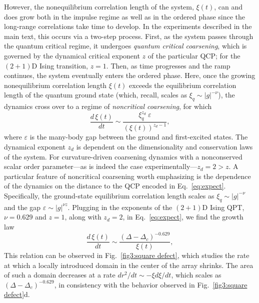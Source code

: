 \documentclass[reprint,twocolumn,secnumarabic,amssymb, aps, prx]{revtex4-2}
\begin{document}
However, the nonequilibrium correlation length of the system, $\xi (t)$, can and does grow both in the impulse regime as well as in the ordered phase since the long-range correlations take time to develop. In the experiments described in the main text, this occurs via a two-step process.
First, as the system passes through the quantum critical regime, it undergoes \textit{quantum critical coarsening}, which is governed by the dynamical critical exponent $z$ of the particular QCP; for the $(2+1)$D Ising transition, $z=1$. Then, as time progresses and the ramp continues, the system eventually enters the ordered phase. Here, once the growing nonequilibrium correlation length $\xi(t)$ exceeds the equilibrium correlation length of the quantum ground state (which, recall, scales as $\xi_q \sim \lvert g \rvert^{-\nu}$), the dynamics cross over to a regime of \textit{noncritical coarsening}, for which
\begin{equation}
\label{eq:expect}
 \frac{d\,\xi(t)}{dt} \sim \frac{\xi_q^{z_d}~\varepsilon}{(\xi(t))^{z_d-1}},
\end{equation}
where $\varepsilon$ is the many-body gap between the ground and first-excited states.  The dynamical exponent $z_d$ is dependent on the dimensionality and conservation laws of the system. For curvature-driven coarsening dynamics with a nonconserved scalar order parameter---as is indeed the case experimentally---$z_d = 2 > z$. A particular feature of noncritical coarsening worth emphasizing is the dependence of the dynamics on the distance to the QCP encoded in  Eq.~\eqref{eq:expect}. Specifically, the ground-state equilibrium correlation length scales as $\xi_q \sim \lvert g \rvert^{-\nu}$ and the gap $\varepsilon \sim \lvert g \rvert^{\nu z}$. Plugging in the exponents of the $(2+1)$D Ising QPT, $\nu = 0.629$ and $z=1$, along with $z_d = 2$, in Eq.~\eqref{eq:expect}, we find the growth law
\begin{equation}
 \frac{d\,\xi(t)}{dt} \sim \frac{(\Delta - \Delta_c)^{-0.629}}{\xi(t)},
\end{equation}
This relation can be observed in Fig.~\ref{fig3:square defect}, which studies the rate at which a locally introduced domain in the center of the array shrinks.
The area of such a domain decreases at a rate $d r^2/dt \sim - \xi d \xi/d t$, which scales as $(\Delta - \Delta_c)^{-0.629}$, in consistency with the behavior observed in Fig.~\ref{fig3:square defect}d.
\end{document}
